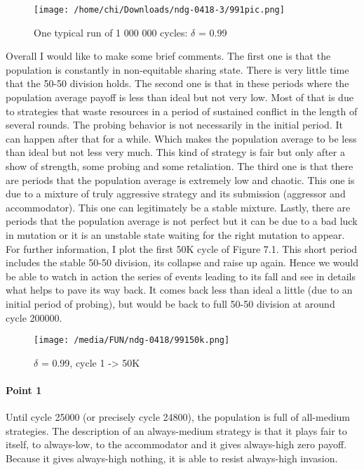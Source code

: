 \documentclass[12.5pt]{report}
\begin{document}
\begin{figure}[h!]
\center
\texttt{[image: /home/chi/Downloads/ndg-0418-3/991pic.png]}
\caption{One typical run of 1 000 000 cycles: $\delta$ = 0.99}
\end{figure}

Overall I would like to make some brief comments. The first one is that the population is constantly in non-equitable sharing state. There is very little time that the 50-50 division holds. The second one is that in these periods where the population average payoff is less than ideal but not very low. Most of that is due to strategies that waste resources in a period of sustained conflict in the length of several rounds. The probing behavior is not necessarily in the initial period. It can happen after that for a while. Which makes the population average to be less than ideal but not less very much. This kind of strategy is fair but only after a show of strength, some probing and some retaliation. The third one is that there are periods that the population average is extremely low and chaotic. This one is due to a mixture of truly aggressive strategy and its submission (aggressor and accommodator). This one can legitimately be a stable mixture. Lastly, there are periods that the population average is not perfect but it can be due to a bad luck in mutation or it is an unstable state waiting for the right mutation to appear.\\

For further information, I plot the first 50K cycle of Figure 7.1. This short period includes the stable 50-50 division, its collapse and raise up again. Hence we would be able to watch in action the series of events leading to its fall and see in details what helps to pave its way back. It comes back less than ideal a little (due to an initial period of probing), but would be back to full 50-50 division at around cycle 200000.

\begin{figure}[h!]
\center
\texttt{[image: /media/FUN/ndg-0418/99150k.png]}
\caption{$\delta$ = 0.99, cycle 1 -> 50K}
\end{figure}

\paragraph{Point 1}

Until cycle 25000 (or precisely cycle 24800), the population is full of all-medium strategies. The description of an always-medium strategy is that it plays fair to itself, to always-low, to the accommodator and it gives always-high zero payoff. Because it gives always-high nothing, it is able to resist always-high invasion.
\end{document}
